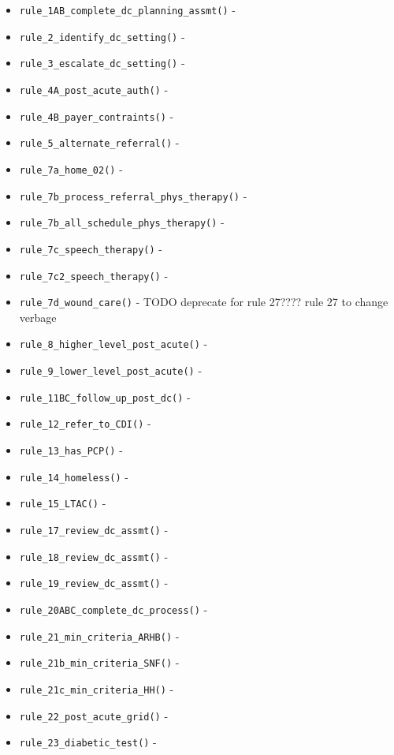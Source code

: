 \documentclass[
]{book}
\providecommand{\tightlist}{%
  \setlength{\itemsep}{0pt}\setlength{\parskip}{0pt}}
\begin{document}
\begin{itemize}
\tightlist
\item
  \texttt{rule\_1AB\_complete\_dc\_planning\_assmt()} -
\item
  \texttt{rule\_2\_identify\_dc\_setting()} -
\item
  \texttt{rule\_3\_escalate\_dc\_setting()} -
\item
  \texttt{rule\_4A\_post\_acute\_auth()} -
\item
  \texttt{rule\_4B\_payer\_contraints()} -
\item
  \texttt{rule\_5\_alternate\_referral()} -
\item
  \texttt{rule\_7a\_home\_02()} -
\item
  \texttt{rule\_7b\_process\_referral\_phys\_therapy()} -
\item
  \texttt{rule\_7b\_all\_schedule\_phys\_therapy()} -
\item
  \texttt{rule\_7c\_speech\_therapy()} -
\item
  \texttt{rule\_7c2\_speech\_therapy()} -
\item
  \texttt{rule\_7d\_wound\_care()} - TODO deprecate for rule 27???? rule 27 to change verbage
\item
  \texttt{rule\_8\_higher\_level\_post\_acute()} -
\item
  \texttt{rule\_9\_lower\_level\_post\_acute()} -
\item
  \texttt{rule\_11BC\_follow\_up\_post\_dc()} -
\item
  \texttt{rule\_12\_refer\_to\_CDI()} -
\item
  \texttt{rule\_13\_has\_PCP()} -
\item
  \texttt{rule\_14\_homeless()} -
\item
  \texttt{rule\_15\_LTAC()} -
\item
  \texttt{rule\_17\_review\_dc\_assmt()} -
\item
  \texttt{rule\_18\_review\_dc\_assmt()} -
\item
  \texttt{rule\_19\_review\_dc\_assmt()} -
\item
  \texttt{rule\_20ABC\_complete\_dc\_process()} -
\item
  \texttt{rule\_21\_min\_criteria\_ARHB()} -
\item
  \texttt{rule\_21b\_min\_criteria\_SNF()} -
\item
  \texttt{rule\_21c\_min\_criteria\_HH()} -
\item
  \texttt{rule\_22\_post\_acute\_grid()} -
\item
  \texttt{rule\_23\_diabetic\_test()} -

\end{itemize}
\end{document}
